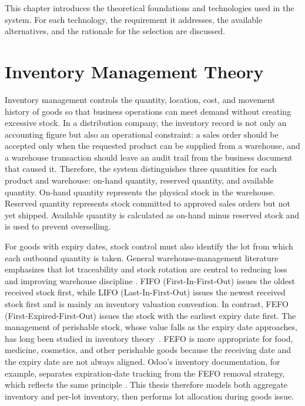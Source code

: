 This chapter introduces the theoretical foundations and technologies used in the
system. For each technology, the requirement it addresses, the available
alternatives, and the rationale for the selection are discussed.

\section{Inventory Management Theory}
Inventory management controls the quantity, location, cost, and movement history
of goods so that business operations can meet demand without creating excessive
stock. In a distribution company, the inventory record is not only an accounting
figure but also an operational constraint: a sales order should be accepted only
when the requested product can be supplied from a warehouse, and a warehouse
transaction should leave an audit trail from the business document that caused
it. Therefore, the system distinguishes three quantities for each product and
warehouse: on-hand quantity, reserved quantity, and available quantity. On-hand
quantity represents the physical stock in the warehouse. Reserved quantity
represents stock committed to approved sales orders but not yet shipped.
Available quantity is calculated as on-hand minus reserved stock and is used to
prevent overselling.

For goods with expiry dates, stock control must also identify the lot from which
each outbound quantity is taken. General warehouse-management literature
emphasizes that lot traceability and stock rotation are central to reducing loss
and improving warehouse discipline \cite{richards2021warehouse}. FIFO
(First-In-First-Out) issues the oldest received stock first, while LIFO
(Last-In-First-Out) issues the newest received stock first and is mainly an
inventory valuation convention. In contrast, FEFO (First-Expired-First-Out)
issues the stock with the earliest expiry date first. The management of
perishable stock, whose value falls as the expiry date approaches, has long been
studied in inventory theory~\cite{nahmias1982perishable}. FEFO is more
appropriate for food, medicine, cosmetics, and other perishable goods because the
receiving date and the expiry date are not always aligned. Odoo's inventory documentation,
for example, separates expiration-date tracking from the FEFO removal strategy,
which reflects the same principle \cite{odooExpiration,odooFefo}. This thesis
therefore models both aggregate inventory and per-lot inventory, then performs
lot allocation during goods issue.

